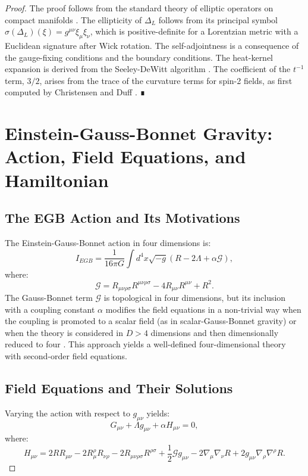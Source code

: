 \documentclass[%
 preprint,
 aps,
 prd,
 amsmath,amssymb,
 floatfix,
 longbibliography,
]{revtex4-2}
\begin{document}
\begin{proof}
The proof follows from the standard theory of elliptic operators on compact manifolds \cite{Gilkey1995}. The ellipticity of \(\Delta_L\) follows from its principal symbol \(\sigma(\Delta_L)(\xi) = g^{\mu\nu}\xi_\mu\xi_\nu\), which is positive-definite for a Lorentzian metric with a Euclidean signature after Wick rotation. The self-adjointness is a consequence of the gauge-fixing conditions and the boundary conditions. The heat-kernel expansion is derived from the Seeley-DeWitt algorithm \cite{Seeley1967, DeWitt1965}. The coefficient of the \(t^{-1}\) term, \(3/2\), arises from the trace of the curvature terms for spin-2 fields, as first computed by Christensen and Duff \cite{ChristensenDuff1978}. ∎

\section{Einstein-Gauss-Bonnet Gravity: Action, Field Equations, and Hamiltonian}
\label{sec:egb}

\subsection{The EGB Action and Its Motivations}

The Einstein-Gauss-Bonnet action in four dimensions is:
\[
\boxed{I_{EGB} = \frac{1}{16\pi G} \int d^4x \sqrt{-g} \left( R - 2\Lambda + \alpha \mathcal{G} \right),}
\]
where:
\[
\mathcal{G} = R_{\mu\nu\rho\sigma}R^{\mu\nu\rho\sigma} - 4R_{\mu\nu}R^{\mu\nu} + R^2.
\]
The Gauss-Bonnet term \(\mathcal{G}\) is topological in four dimensions, but its inclusion with a coupling constant \(\alpha\) modifies the field equations in a non-trivial way when the coupling is promoted to a scalar field (as in scalar-Gauss-Bonnet gravity) or when the theory is considered in \(D > 4\) dimensions and then dimensionally reduced to four \cite{GlavanLin2020}. This approach yields a well-defined four-dimensional theory with second-order field equations.

\subsection{Field Equations and Their Solutions}

Varying the action with respect to \(g_{\mu\nu}\) yields:
\[
\boxed{G_{\mu\nu} + \Lambda g_{\mu\nu} + \alpha H_{\mu\nu} = 0,}
\]
where:
\[
H_{\mu\nu} = 2 R R_{\mu\nu} - 2 R_{\mu}^{\rho} R_{\nu\rho} - 2 R_{\mu\nu\rho\sigma} R^{\rho\sigma} + \frac{1}{2} \mathcal{G} g_{\mu\nu} - 2 \nabla_{\mu}\nabla_{\nu} R + 2 g_{\mu\nu} \nabla_{\rho}\nabla^{\rho} R.
\]


\end{proof}
\end{document}
